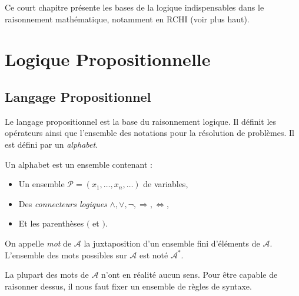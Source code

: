 


Ce court chapitre présente les bases de la logique indispensables dans le raisonnement 
mathématique, notamment en RCHI (voir plus haut). 


\section{Logique Propositionnelle}

\subsection{Langage Propositionnel}

Le langage propositionnel est la base du raisonnement logique. Il définit les opérateurs 
ainsi que l'ensemble des notations pour la résolution de problèmes. Il est 
défini par un \emph{alphabet}.

\begin{definition}
    Un alphabet est un ensemble contenant : 
    \begin{itemize} 
        \item Un ensemble $ \mathcal{P} = (x_1, \dots, x_n, \dots)$ de variables, 
        \item Des \emph{connecteurs logiques} $ \land, \lor, \lnot, \Rightarrow, \iff$, 
        \item Et les parenthèses $ ($ et $)$. 
    \end{itemize}
    On appelle \emph{mot} de $ \mathcal{A}$ la juxtaposition d'un ensemble fini d'éléments 
    de $ \mathcal{A}$. L'ensemble des mots possibles sur $ \mathcal{A}$ est noté $ \mathcal{A}^*$. 
\end{definition}

La plupart des mots de $ \mathcal{A}$ n'ont en réalité aucun sens. Pour être capable de raisonner 
dessus, il nous faut fixer un ensemble de règles de syntaxe. 

